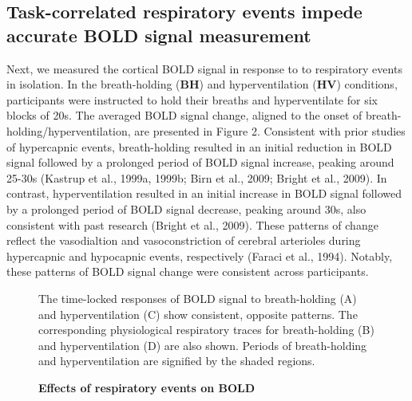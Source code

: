 \documentclass[9pt]{NEU502b-fmri}
\begin{document}
\subsection{Task-correlated respiratory events impede accurate BOLD signal measurement}
Next, we measured the cortical BOLD signal in response to to respiratory events in isolation. In the breath-holding (\textbf{BH}) and hyperventilation (\textbf{HV}) conditions, participants were instructed to hold their breaths and hyperventilate for six blocks of 20s. The averaged BOLD signal change, aligned to the onset of breath-holding/hyperventilation, are presented in Figure 2. Consistent with prior studies of hypercapnic events, breath-holding resulted in an initial reduction in BOLD signal followed by a prolonged period of BOLD signal increase, peaking around 25-30s (Kastrup et al., 1999a, 1999b; Birn et al., 2009; Bright et al., 2009). In contrast, hyperventilation resulted in an initial increase in BOLD signal followed by a prolonged period of BOLD signal decrease, peaking around 30s, also consistent with past research (Bright et al., 2009). These patterns of change reflect the vasodialtion and vasoconstriction of cerebral arterioles during hypercapnic and hypocapnic events, respectively (Faraci et al., 1994). Notably, these patterns of BOLD signal change were consistent across participants. 

\begin{figure}
\centerline{%
%
}
\caption{\textbf{Effects of respiratory events on BOLD}}
\par The time-locked responses of BOLD signal to breath-holding (A) and hyperventilation (C) show consistent, opposite patterns. The corresponding physiological respiratory traces for breath-holding (B) and hyperventilation (D) are also shown. Periods of breath-holding and hyperventilation are signified by the shaded regions.

\end{figure}
\end{document}
